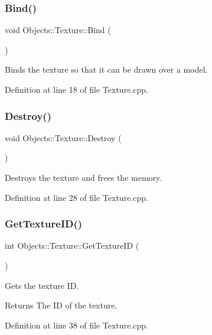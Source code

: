 \subsubsection{\texorpdfstring{Bind()}{Bind()}}
{\footnotesize\ttfamily void Objects\+::\+Texture\+::\+Bind (\begin{DoxyParamCaption}{ }\end{DoxyParamCaption})}

Binds the texture so that it can be drawn over a model. 

Definition at line 18 of file Texture.\+cpp.

\mbox{\label{class_objects_1_1_texture_a50e08a5bbec2568ac45ba2d49d3c1dbd}} 
\subsubsection{\texorpdfstring{Destroy()}{Destroy()}}
{\footnotesize\ttfamily void Objects\+::\+Texture\+::\+Destroy (\begin{DoxyParamCaption}{ }\end{DoxyParamCaption})}

Destroys the texture and free\textquotesingle{}s the memory. 

Definition at line 28 of file Texture.\+cpp.

\mbox{\label{class_objects_1_1_texture_a6d1a2e5398eab5d19ef717638305f9c4}} 
\subsubsection{\texorpdfstring{Get\+Texture\+I\+D()}{GetTextureID()}}
{\footnotesize\ttfamily int Objects\+::\+Texture\+::\+Get\+Texture\+ID (\begin{DoxyParamCaption}{ }\end{DoxyParamCaption})}

Gets the texture ID. \begin{DoxyReturn}{Returns}
The ID of the texture. 
\end{DoxyReturn}


Definition at line 38 of file Texture.\+cpp.

